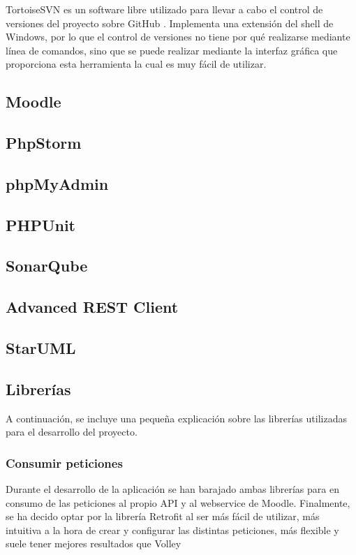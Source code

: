 TortoiseSVN es un software libre utilizado para llevar a cabo el control de versiones del proyecto sobre GitHub \cite{wiki:tortoisesvn}. Implementa una extensión del shell de Windows, por lo que el control de versiones no tiene por qué realizarse mediante línea de comandos, sino que se puede realizar mediante la interfaz gráfica que proporciona esta herramienta la cual es muy fácil de utilizar.

\subsection{Moodle}
\subsection{PhpStorm}
\subsection{phpMyAdmin}
\subsection{PHPUnit}
\subsection{SonarQube}
\subsection{Advanced REST Client}
\subsection{StarUML}
\subsection{Librerías}

A continuación, se incluye una pequeña explicación sobre las librerías utilizadas para el desarrollo del proyecto.

\subsubsection{Consumir peticiones}

Durante el desarrollo de la aplicación se han barajado ambas librerías para en consumo de las peticiones al propio API y al webservice de Moodle. Finalmente, se ha decido optar por la librería Retrofit al ser más fácil de utilizar, más intuitiva a la hora de crear y configurar las distintas peticiones, más flexible y suele tener mejores resultados que Volley

